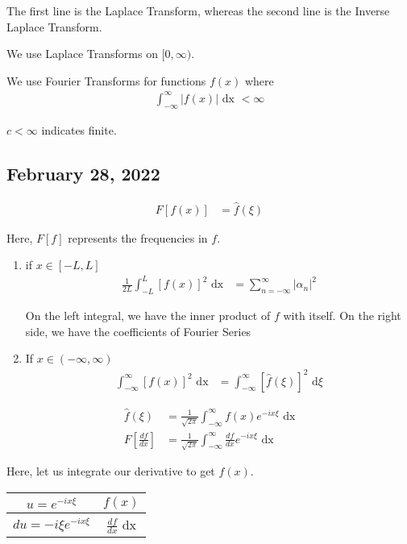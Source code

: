 The first line is the Laplace Transform, whereas the second line is the Inverse Laplace Transform.

We use Laplace Transforms on $[0, \infty)$.

\note We use Fourier Transforms for functions $f(x)$ where
%
\begin{align}
  \int^\infty_{-\infty} |f(x)| \text{ dx } < \infty
\end{align}

\note $c < \infty$ indicates finite.

\newpage

\subsection*{February 28, 2022}
%
\begin{align}
  F[f(x)] & = \hat f(\xi)
\end{align}

Here, $F[f]$ represents the frequencies in $f$.
\bigbreak
{}
\begin{enumerate}
  \item if $x \in [-L, L]$
  \begin{align}
    \frac{1}{2L} \int^L_{-L} [f(x)]^2 \text{ dx} & = \sum^\infty_{n = -\infty} |\alpha_n|^2
  \end{align}

  On the left integral, we have the inner product of $f$ with itself.
  On the right side, we have the coefficients of Fourier Series
  \item If $x \in (-\infty, \infty)$
  \begin{align}
    \int^\infty_{-\infty} [f(x)]^2 \text{ dx} & = \int^\infty_{-\infty} [\hat f(\xi)]^2 \text{ d}\xi
  \end{align}
\end{enumerate}

%
\begin{align}
  \hat f(\xi) & = \frac{1}{\sqrt{2 \pi}} \int^\infty_{-\infty} f(x) e^{-i x \xi} \text{ dx}\\
  F\left[\frac{df}{dx}\right] & = \frac{1}{\sqrt{2 \pi}} \int^\infty_{-\infty} \frac{df}{dx} e^{- i x \xi} \text{ dx}
\end{align}

Here, let us integrate our derivative to get $f(x)$.
\begin{center}
  \begin{tabular}{c|c}
    $u = e^{-i x \xi}$ & $f(x)$\\
    \hline
    $du = -i \xi e^{-i x \xi}$ & $\frac{df}{dx}$ dx
  \end{tabular}
\end{center}

